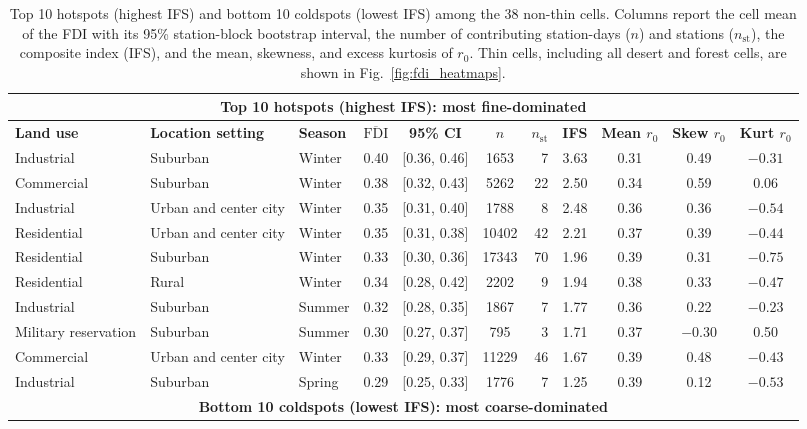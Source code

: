 \documentclass[a4paper,fleqn]{cas-sc}
\begin{document}
\begin{table}[!htbp]
\centering
\scriptsize
\caption{Top 10 hotspots (highest IFS) and bottom 10 coldspots (lowest IFS) among the 38 non-thin cells. Columns report the cell mean of the FDI with its 95\% station-block bootstrap interval, the number of contributing station-days ($n$) and stations ($n_{\mathrm{st}}$), the composite index (IFS), and the mean, skewness, and excess kurtosis of $r_0$. Thin cells, including all desert and forest cells, are shown in Fig.~\ref{fig:fdi_heatmaps}.}
\label{tab:hotcold_overall}
\begin{tabular}{lllcccrrccc}
\toprule
\multicolumn{11}{c}{\textbf{Top 10 hotspots (highest IFS): most fine-dominated}} \\
\midrule
\textbf{Land use} & \textbf{Location setting} & \textbf{Season} & \textbf{$\overline{\mathrm{FDI}}$} & \textbf{95\% CI} & \textbf{$n$} & \textbf{$n_{\mathrm{st}}$} & \textbf{IFS} & \textbf{Mean $r_0$} & \textbf{Skew $r_0$} & \textbf{Kurt $r_0$} \\
\midrule
Industrial & Suburban & Winter & 0.40 & [0.36, 0.46] & 1653 & 7 & 3.63 & 0.31 & 0.49 & $-0.31$ \\
Commercial & Suburban & Winter & 0.38 & [0.32, 0.43] & 5262 & 22 & 2.50 & 0.34 & 0.59 & 0.06 \\
Industrial & Urban and center city & Winter & 0.35 & [0.31, 0.40] & 1788 & 8 & 2.48 & 0.36 & 0.36 & $-0.54$ \\
Residential & Urban and center city & Winter & 0.35 & [0.31, 0.38] & 10402 & 42 & 2.21 & 0.37 & 0.39 & $-0.44$ \\
Residential & Suburban & Winter & 0.33 & [0.30, 0.36] & 17343 & 70 & 1.96 & 0.39 & 0.31 & $-0.75$ \\
Residential & Rural & Winter & 0.34 & [0.28, 0.42] & 2202 & 9 & 1.94 & 0.38 & 0.33 & $-0.47$ \\
Industrial & Suburban & Summer & 0.32 & [0.28, 0.35] & 1867 & 7 & 1.77 & 0.36 & 0.22 & $-0.23$ \\
Military reservation & Suburban & Summer & 0.30 & [0.27, 0.37] & 795 & 3 & 1.71 & 0.37 & $-0.30$ & 0.50 \\
Commercial & Urban and center city & Winter & 0.33 & [0.29, 0.37] & 11229 & 46 & 1.67 & 0.39 & 0.48 & $-0.43$ \\
Industrial & Suburban & Spring & 0.29 & [0.25, 0.33] & 1776 & 7 & 1.25 & 0.39 & 0.12 & $-0.53$ \\
\midrule
\multicolumn{11}{c}{\textbf{Bottom 10 coldspots (lowest IFS): most coarse-dominated}} \\

\end{tabular}
\end{table}
\end{document}

